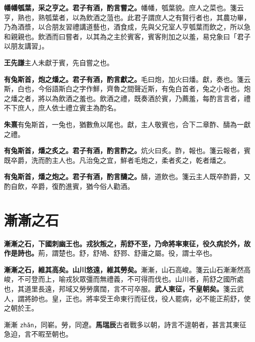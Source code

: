 \textbf{幡幡瓠葉，采之亨之。君子有酒，酌言嘗之。}{\footnotesize 幡幡，瓠葉貌。庶人之菜也。箋云亨，熟也，熟瓠葉者，以為飲酒之菹也。此君子謂庶人之有賢行者也，其農功畢，乃為酒漿，以合朋友習禮講道藝也，酒食成，先與父兄室人亨瓠葉而飲之，所以急和親親也。飲酒而曰嘗者，以其為之主於賓客，賓客則加之以羞，易兌象曰「君子以朋友講習」。}

\begin{quoting}\textbf{王先謙}主人未獻于賓，先自嘗之也。\end{quoting}

\textbf{有兔斯首，炮之燔之。君子有酒，酌言獻之。}{\footnotesize 毛曰炮，加火曰燔。獻，奏也。箋云斯，白也，今俗語斯白之字作鮮，齊魯之間聲近斯，有兔白首者，兔之小者也。炮之燔之者，將以為飲酒之羞也。飲酒之禮，既奏酒於賓，乃薦羞，每酌言言者，禮不下庶人，庶人依士禮立賓主為酌名。}

\begin{quoting}\textbf{朱熹}有兔斯首，一兔也，猶數魚以尾也。獻，主人敬賓也，合下二章酢、醻為一獻之禮。\end{quoting}

\textbf{有兔斯首，燔之炙之。君子有酒，酌言酢之。}{\footnotesize 炕火曰炙。酢，報也。箋云報者，賓既卒爵，洗而酌主人也。凡治兔之宜，鮮者毛炮之，柔者炙之，乾者燔之。}

\textbf{有兔斯首，燔之炮之。君子有酒，酌言醻之。}{\footnotesize 醻，道飲也。箋云主人既卒酢爵，又酌自飲，卒爵，復酌進賓，猶今俗人勸酒。}

\section{漸漸之石}


\textbf{漸漸之石，下國刺幽王也。戎狄叛之，荊舒不至，乃命將率東征，役久病於外，故作是詩也。}{\footnotesize 荊，謂楚也。舒，舒鳩、舒鄝、舒庸之屬。役，謂士卒也。}

\textbf{漸漸之石，維其高矣。山川悠遠，維其勞矣。}{\footnotesize 漸漸，山石高峻。箋云山石漸漸然高峻，不可登而上，喻戎狄眾彊而無禮義，不可得而伐也。山川者，荊舒之國所處也，其道里長遠，邦域又勞勞廣闊，言不可卒服。}\textbf{武人東征，不皇朝矣。}{\footnotesize 箋云武人，謂將帥也。皇，正也。將率受王命東行而征伐，役人罷病，必不能正荊舒，使之朝於王。}

\begin{quoting}漸漸 \texttt{zhǎn}，同嶄。勞，同遼。\textbf{馬瑞辰}古者戰多以朝，詩言不遑朝者，甚言其東征急迫，言不暇至朝也。\end{quoting}

